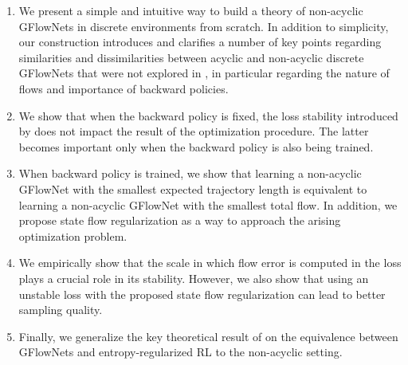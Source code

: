 \vspace{-0.3cm}
\begin{enumerate}[itemsep=-2.2pt,leftmargin=12pt]%
    \item We present a simple and intuitive way to build a theory of non-acyclic GFlowNets in discrete environments from scratch. In addition to simplicity, our construction introduces and clarifies a number of key points regarding similarities and dissimilarities between acyclic and non-acyclic discrete GFlowNets that were not explored in \cite{brunswic2024theory}, in particular regarding the nature of flows and importance of backward policies.
    \item We show that when the backward policy is fixed, the loss stability introduced by \cite{brunswic2024theory} does not impact the result of the optimization procedure. The latter becomes important only when the backward policy is also being trained. 
    \item When backward policy is trained, we show that learning a non-acyclic GFlowNet with the smallest expected trajectory length is equivalent to learning a non-acyclic GFlowNet with the smallest total flow. In addition, we propose state flow regularization as a way to approach the arising optimization problem.
    \item We empirically show that the scale in which flow error is computed in the loss plays a crucial role in its stability. However, we also show that using an unstable loss with the proposed state flow regularization can lead to better sampling quality.
    \item Finally, we generalize the key theoretical result of \cite{tiapkin2024generative} on the equivalence between GFlowNets and entropy-regularized RL to the non-acyclic setting.
\end{enumerate}


